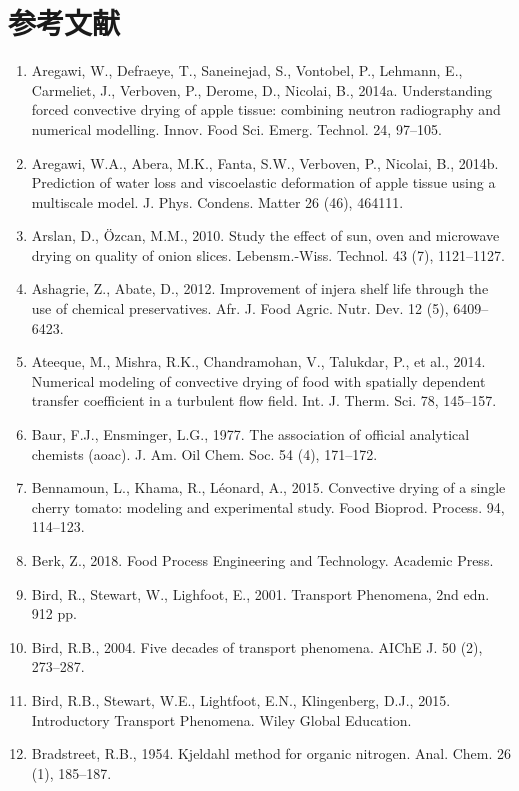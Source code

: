 \documentclass[11pt,a4paper]{ctexart}
\begin{document}
\section*{参考文献}
\small
\begin{enumerate}
\item Aregawi, W., Defraeye, T., Saneinejad, S., Vontobel, P., Lehmann, E., Carmeliet, J., Verboven, P., Derome, D., Nicolai, B., 2014a. Understanding forced convective drying of apple tissue: combining neutron radiography and numerical modelling. Innov. Food Sci. Emerg. Technol. 24, 97--105.
\item Aregawi, W.A., Abera, M.K., Fanta, S.W., Verboven, P., Nicolai, B., 2014b. Prediction of water loss and viscoelastic deformation of apple tissue using a multiscale model. J. Phys. Condens. Matter 26 (46), 464111.
\item Arslan, D., Özcan, M.M., 2010. Study the effect of sun, oven and microwave drying on quality of onion slices. Lebensm.-Wiss. Technol. 43 (7), 1121--1127.
\item Ashagrie, Z., Abate, D., 2012. Improvement of injera shelf life through the use of chemical preservatives. Afr. J. Food Agric. Nutr. Dev. 12 (5), 6409--6423.
\item Ateeque, M., Mishra, R.K., Chandramohan, V., Talukdar, P., et al., 2014. Numerical modeling of convective drying of food with spatially dependent transfer coefficient in a turbulent flow field. Int. J. Therm. Sci. 78, 145--157.
\item Baur, F.J., Ensminger, L.G., 1977. The association of official analytical chemists (aoac). J. Am. Oil Chem. Soc. 54 (4), 171--172.
\item Bennamoun, L., Khama, R., Léonard, A., 2015. Convective drying of a single cherry tomato: modeling and experimental study. Food Bioprod. Process. 94, 114--123.
\item Berk, Z., 2018. Food Process Engineering and Technology. Academic Press.
\item Bird, R., Stewart, W., Lighfoot, E., 2001. Transport Phenomena, 2nd edn. 912 pp.
\item Bird, R.B., 2004. Five decades of transport phenomena. AIChE J. 50 (2), 273--287.
\item Bird, R.B., Stewart, W.E., Lightfoot, E.N., Klingenberg, D.J., 2015. Introductory Transport Phenomena. Wiley Global Education.
\item Bradstreet, R.B., 1954. Kjeldahl method for organic nitrogen. Anal. Chem. 26 (1), 185--187.

\end{enumerate}
\end{document}
